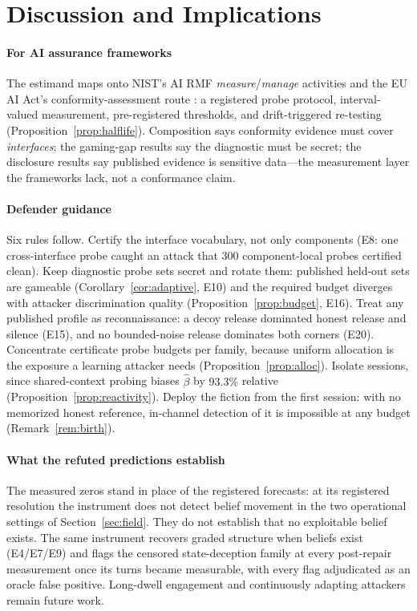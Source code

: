 \section{Discussion and Implications}\label{sec:discussion}

\paragraph{For AI assurance frameworks}
The estimand maps onto NIST's AI RMF \emph{measure}/\emph{manage} activities
\cite{nist2023} and the EU AI Act's conformity-assessment route
\cite{euaiact2024}: a registered probe protocol, interval-valued measurement,
pre-registered thresholds, and drift-triggered re-testing
(Proposition~\ref{prop:halflife}). Composition says conformity evidence must
cover \emph{interfaces}; the gaming-gap results say the diagnostic must be
secret; the disclosure results say published evidence is sensitive data---the
measurement layer the frameworks lack, not a conformance claim.

\paragraph{Defender guidance}
Six rules follow. Certify the interface vocabulary,
not only components (E8: one cross-interface probe caught an attack that 300
component-local probes certified clean). Keep diagnostic probe sets secret and
rotate them: published held-out sets are gameable
(Corollary~\ref{cor:adaptive}, E10) and the required budget diverges with
attacker discrimination quality (Proposition~\ref{prop:budget}, E16). Treat
any published profile as reconnaissance: a decoy release dominated honest
release and silence (E15), and no bounded-noise release dominates both corners
(E20). Concentrate certificate probe budgets per family, because uniform
allocation is the exposure a learning attacker needs
(Proposition~\ref{prop:alloc}). Isolate sessions, since shared-context probing
biases $\hat\beta$ by $93.3\%$ relative (Proposition~\ref{prop:reactivity}).
Deploy the fiction from the first session: with no memorized honest
reference, in-channel detection of it is impossible at any budget
(Remark~\ref{rem:birth}).

\paragraph{What the refuted predictions establish}
The measured zeros stand in place of the registered forecasts: at its
registered resolution the instrument does not detect belief movement in the
two operational settings of Section~\ref{sec:field}. They do not establish
that no exploitable belief exists. The same instrument recovers graded
structure when beliefs exist (E4/E7/E9) and flags the censored
state-deception family at every post-repair measurement once its turns became
measurable, with every flag adjudicated as an oracle false positive.
Long-dwell engagement and continuously adapting attackers remain future work.


